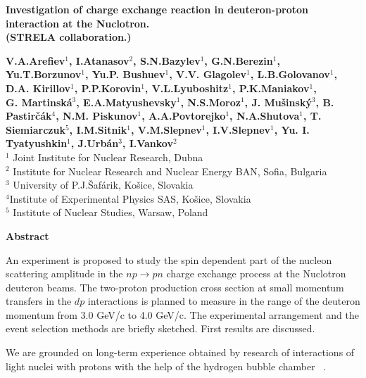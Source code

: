 \documentclass[a4paper,12pt]{article}
\begin{document}
\begin{center}
  {\Large\bf Investigation of charge exchange reaction in deuteron-proton
    interaction at the Nuclotron.} \\

  {\large\bf  (STRELA collaboration.)}
\end{center}
{\large\bf
  V.A.Arefiev$^{1}$, I.Atanasov$^{2}$, S.N.Bazylev$^{1}$, G.N.Berezin$^{1}$,\\
  Yu.T.Borzunov$^{1}$, Yu.P. Bushuev$^{1}$, V.V. Glagolev$^{1}$,
  L.B.Golovanov$^{1}$, D.A. Kirillov$^{1}$,
  P.P.Korovin$^{1}$,  V.L.Lyuboshitz$^{1}$,  P.K.Maniakov$^{1}$,\\
  G. Martinsk\'{a}$^{3}$,
  E.A.Matyushevsky$^{1}$, N.S.Moroz$^{1}$, J. Mu\v sinsk\'y$^{3}$,
  B. Pastir\v c\'ak$^{4}$,
  N.M. Piskunov$^{1}$, A.A.Povtorejko$^{1}$, N.A.Shutova$^{1}$,
  T. Siemiarczuk$^{5}$, I.M.Sitnik$^{1}$, V.M.Slepnev$^{1}$, I.V.Slepnev$^{1}$,
  Yu. I. Tyatyushkin$^{1}$, J.Urb\'{a}n$^{3}$,  I.Vankov$^{2}$
}\\

\hspace{-0.75cm}
\small{$^{1}$ Joint Institute for Nuclear Research, Dubna \\
  $^{2}$ Institute for Nuclear Research and Nuclear Energy BAN, Sofia, Bulgaria \\
  $^{3}$ University of P.J.\v{S}af\'{a}rik, Ko\v{s}ice,
  Slovakia \\
  $^{4}$Institute of Experimental Physics SAS, Ko\v{s}ice,
  Slovakia \\
  $^{5}$ Institute of Nuclear Studies, Warsaw, Poland \\}

\begin{center}
  {\bf Abstract}
\end{center}
\noindent

{ An experiment is proposed to study the spin dependent part of the nucleon
  scattering amplitude in the $np \to pn$ charge exchange process at the Nuclotron
  deuteron beams. The two-proton production cross section at small momentum
  transfers in the $dp$ interactions is planned to measure in the range of the
  deuteron momentum from 3.0 GeV/c to 4.0 GeV/c. The experimental arrangement and
  the event selection methods are briefly sketched. First
  results are discussed.
}

\vspace*{0.5cm}

\indent

We are grounded on long-term experience obtained by research of interactions of
light nuclei with protons with the help of the hydrogen bubble chamber~\cite
{a1} .
\end{document}

